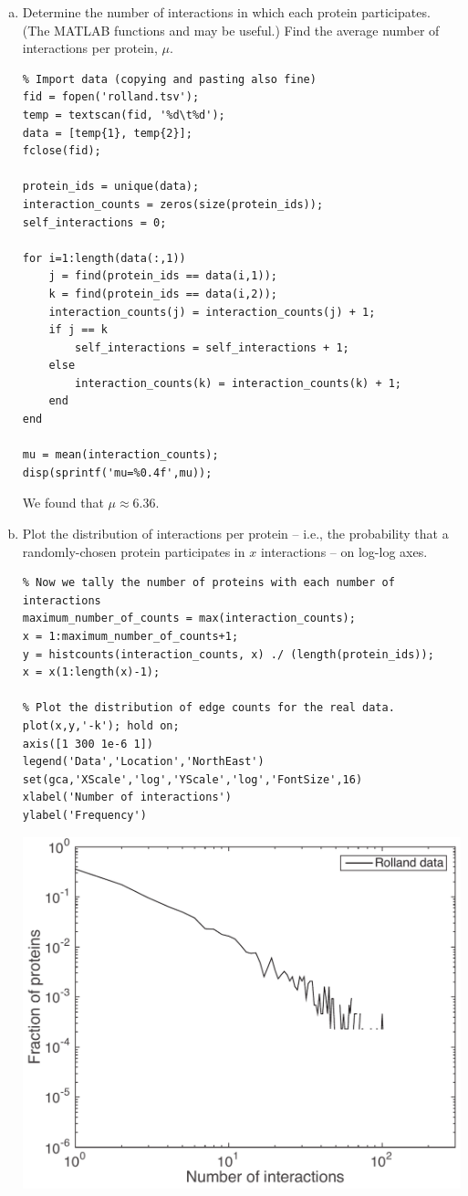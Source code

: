 \documentclass{article}
\begin{document}
\begin{enumerate}[a)]
\setlength{\itemsep}{0pt}
\item Determine the number of interactions in which each protein participates. (The MATLAB \linebreak functions  and  may be useful.)  Find the average number of interactions per protein, $\mu$.\\

\begin{lstlisting}
% Import data (copying and pasting also fine)
fid = fopen('rolland.tsv');
temp = textscan(fid, '%d\t%d');
data = [temp{1}, temp{2}];
fclose(fid);

protein_ids = unique(data);
interaction_counts = zeros(size(protein_ids));
self_interactions = 0;

for i=1:length(data(:,1))
    j = find(protein_ids == data(i,1));
    k = find(protein_ids == data(i,2));
    interaction_counts(j) = interaction_counts(j) + 1;
    if j == k
        self_interactions = self_interactions + 1;
    else
        interaction_counts(k) = interaction_counts(k) + 1;
    end
end

mu = mean(interaction_counts);
disp(sprintf('mu=%0.4f',mu));
\end{lstlisting}

{\color{red}
We found that $\mu \approx 6.36$.
}
\item Plot the distribution of interactions per protein -- i.e., the probability that a randomly-chosen protein participates in $x$ interactions -- on log-log axes.\\

\begin{lstlisting}
% Now we tally the number of proteins with each number of interactions
maximum_number_of_counts = max(interaction_counts);
x = 1:maximum_number_of_counts+1;
y = histcounts(interaction_counts, x) ./ (length(protein_ids));
x = x(1:length(x)-1);

% Plot the distribution of edge counts for the real data.
plot(x,y,'-k'); hold on;
axis([1 300 1e-6 1])
legend('Data','Location','NorthEast')
set(gca,'XScale','log','YScale','log','FontSize',16)
xlabel('Number of interactions')
ylabel('Frequency')
\end{lstlisting}

\begin{center}\includegraphics[width=0.4 \textwidth]{prob2b.pdf}\end{center}

\end{enumerate}
\end{document}
